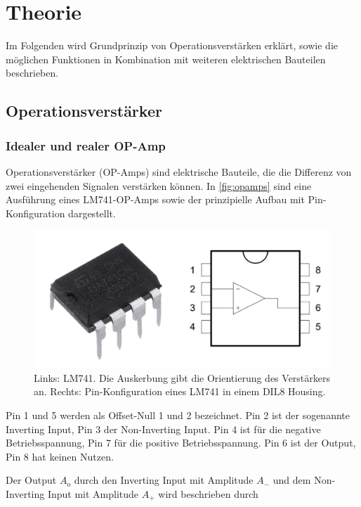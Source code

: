\section{Theorie}
\label{sec:Theorie}

Im Folgenden wird Grundprinzip von Operationsverstärken erklärt, sowie die möglichen Funktionen in Kombination mit 
weiteren elektrischen Bauteilen beschrieben.

\subsection{Operationsverstärker}

\subsubsection{Idealer und realer OP-Amp}
Operationsverstärker (OP-Amps) sind elektrische Bauteile, die die Differenz von zwei eingehenden Signalen verstärken können.
In \autoref{fig:opamps} sind eine Ausführung eines LM741-OP-Amps sowie der prinzipielle Aufbau mit Pin-Konfiguration dargestellt.

\begin{figure}[H]
    \centering
    \includegraphics[width=\textwidth]{../theorie_bilder/opamp.png}
    \caption{Links: LM741. Die Auskerbung gibt die Orientierung des Verstärkers an. Rechts: Pin-Konfiguration eines LM741 in einem DIL8 Housing.}
    \label{fig:opamps}
\end{figure}

Pin 1 und 5 werden als Offset-Null 1 und 2 bezeichnet. Pin 2 ist der sogenannte Inverting Input, Pin 3 der Non-Inverting Input. Pin 4 ist für die negative Betriebsspannung, Pin 7 für die positive Betriebsspannung. Pin 6 ist der Output, Pin 8 hat keinen Nutzen.

Der Output $A_\text{o}$ durch den Inverting Input mit Amplitude $A_-$ und dem Non-Inverting Input mit Amplitude $A_+$ wird beschrieben durch


